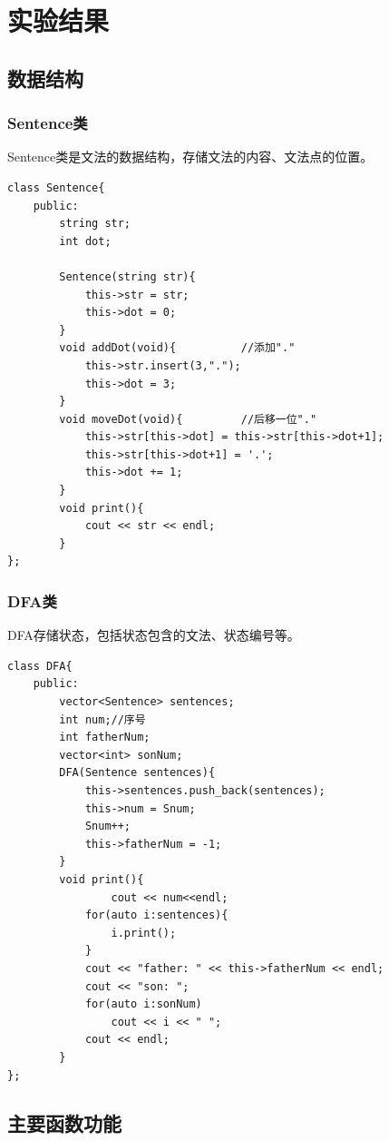 \documentclass{ctexrep}
\begin{document}
\section{实验结果}

\subsection{数据结构}
\subsubsection{Sentence类}
Sentence类是文法的数据结构，存储文法的内容、文法点的位置。
\begin{verbatim}
class Sentence{
    public:
        string str;
        int dot;

        Sentence(string str){
            this->str = str;
            this->dot = 0;
        }
        void addDot(void){          //添加"."
            this->str.insert(3,".");
            this->dot = 3;
        }
        void moveDot(void){         //后移一位"."
            this->str[this->dot] = this->str[this->dot+1];
            this->str[this->dot+1] = '.';
            this->dot += 1;
        }
        void print(){
            cout << str << endl;
        }
};
\end{verbatim}
\subsubsection{DFA类}
DFA存储状态，包括状态包含的文法、状态编号等。
\begin{verbatim}
class DFA{
    public:
        vector<Sentence> sentences;
        int num;//序号
        int fatherNum;
        vector<int> sonNum;
        DFA(Sentence sentences){
            this->sentences.push_back(sentences);
            this->num = Snum;
            Snum++;
            this->fatherNum = -1;
        }
        void print(){
                cout << num<<endl;
            for(auto i:sentences){
                i.print();
            }
            cout << "father: " << this->fatherNum << endl;
            cout << "son: ";
            for(auto i:sonNum)
                cout << i << " ";
            cout << endl;
        }
};
\end{verbatim}
\subsection{主要函数功能}
\end{document}
